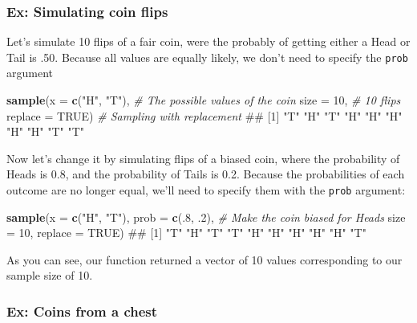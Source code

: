 \documentclass[]{book}
\newenvironment{Shaded}{\begin{snugshade}}{\end{snugshade}}
\newcommand{\KeywordTok}[1]{\textcolor[rgb]{0.13,0.29,0.53}{\textbf{{#1}}}}
\newcommand{\DataTypeTok}[1]{\textcolor[rgb]{0.13,0.29,0.53}{{#1}}}
\newcommand{\DecValTok}[1]{\textcolor[rgb]{0.00,0.00,0.81}{{#1}}}
\newcommand{\StringTok}[1]{\textcolor[rgb]{0.31,0.60,0.02}{{#1}}}
\newcommand{\CommentTok}[1]{\textcolor[rgb]{0.56,0.35,0.01}{\textit{{#1}}}}
\newcommand{\OtherTok}[1]{\textcolor[rgb]{0.56,0.35,0.01}{{#1}}}
\newcommand{\NormalTok}[1]{{#1}}
\theoremstyle{definition}
\theoremstyle{definition}
\theoremstyle{remark}
\begin{document}
\subsubsection{Ex: Simulating coin
flips}\label{ex-simulating-coin-flips}

Let's simulate 10 flips of a fair coin, were the probably of getting
either a Head or Tail is .50. Because all values are equally likely, we
don't need to specify the \texttt{prob} argument

\begin{Shaded}
\begin{Highlighting}[]
\KeywordTok{sample}\NormalTok{(}\DataTypeTok{x =} \KeywordTok{c}\NormalTok{(}\StringTok{"H"}\NormalTok{, }\StringTok{"T"}\NormalTok{), }\CommentTok{# The possible values of the coin}
       \DataTypeTok{size =} \DecValTok{10}\NormalTok{,  }\CommentTok{# 10 flips}
       \DataTypeTok{replace =} \OtherTok{TRUE}\NormalTok{) }\CommentTok{# Sampling with replacement}
\NormalTok{##  [1] "T" "H" "T" "H" "H" "H" "H" "H" "T" "T"}
\end{Highlighting}
\end{Shaded}

Now let's change it by simulating flips of a biased coin, where the
probability of Heads is 0.8, and the probability of Tails is 0.2.
Because the probabilities of each outcome are no longer equal, we'll
need to specify them with the \texttt{prob} argument:

\begin{Shaded}
\begin{Highlighting}[]
\KeywordTok{sample}\NormalTok{(}\DataTypeTok{x =} \KeywordTok{c}\NormalTok{(}\StringTok{"H"}\NormalTok{, }\StringTok{"T"}\NormalTok{),}
       \DataTypeTok{prob =} \KeywordTok{c}\NormalTok{(.}\DecValTok{8}\NormalTok{, .}\DecValTok{2}\NormalTok{), }\CommentTok{# Make the coin biased for Heads}
       \DataTypeTok{size =} \DecValTok{10}\NormalTok{,}
       \DataTypeTok{replace =} \OtherTok{TRUE}\NormalTok{)}
\NormalTok{##  [1] "T" "H" "T" "T" "H" "H" "H" "H" "H" "T"}
\end{Highlighting}
\end{Shaded}

As you can see, our function returned a vector of 10 values
corresponding to our sample size of 10.

\subsubsection{Ex: Coins from a chest}\label{ex-coins-from-a-chest}
\end{document}
